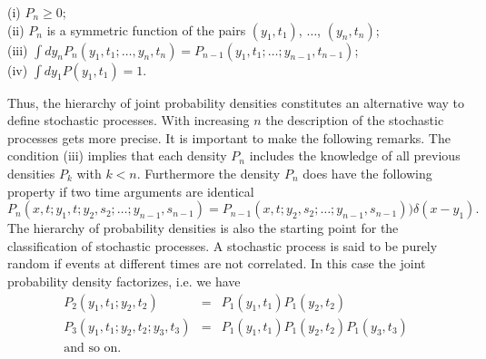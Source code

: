 (i) $P_n \ge 0$; \\
(ii) $P_n$ is a symmetric function of the pairs $(y_1,t_1)$, 
$\ldots$, $(y_n,t_n)$; \\
(iii) $\int dy_n P_n(y_1,t_1; \ldots , y_n,t_n) =
     P_{n-1}(y_1,t_1; \ldots ; y_{n-1},t_{n-1})$; \\
(iv) $\int dy_1 P(y_1,t_1) =1$.

Thus, the hierarchy of joint probability densities constitutes an 
alternative way to define stochastic processes. 
With increasing $n$ the description of the stochastic processes gets
more precise. It is important to 
make the following remarks.  The condition (iii) implies that each 
density $P_n$ includes the knowledge of all previous densities
$P_k$ with $k<n$. Furthermore the density $P_n$ does have the 
following property if two time arguments are identical
\begin{equation*}
P_n(x,t;y_1,t;y_2,s_2; \ldots ; y_{n-1},s_{n-1}) = 
P_{n-1}(x,t;y_2,s_2; \ldots ; y_{n-1},s_{n-1})) 
\delta(x-y_1).
\end{equation*}
The hierarchy of probability densities is also the starting point 
for the classification of stochastic processes. A stochastic 
process is said to be purely random if events at different times 
are not correlated. In this case the joint probability density 
factorizes, i.e. we have
\begin{eqnarray*}
P_2(y_1,t_1;y_2,t_2) &=& P_1(y_1,t_1) P_1(y_2,t_2) \\
P_3(y_1,t_1;y_2,t_2;y_3,t_3) &=& P_1(y_1,t_1) P_1(y_2,t_2)P_1(y_3,t_3) 
\\
\text{and so on.} &&
\end{eqnarray*}

